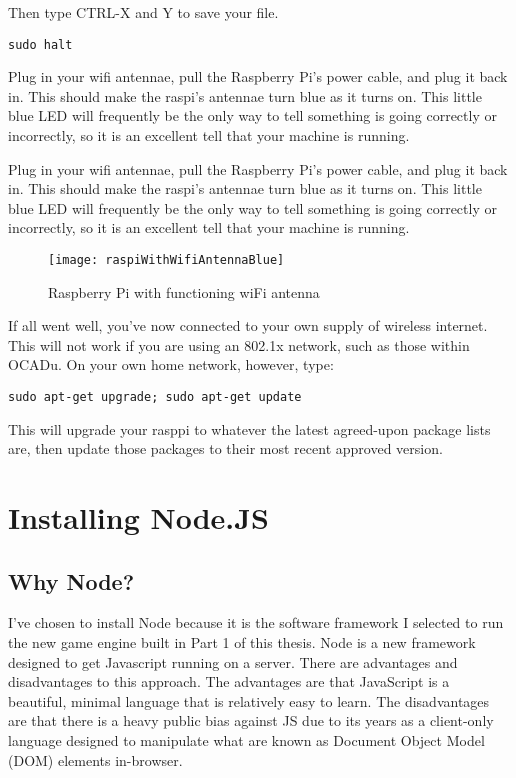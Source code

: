 Then type CTRL-X and Y to save your file.

\begin{lstlisting}
sudo halt
\end{lstlisting}

Plug in your wifi antennae, pull the Raspberry Pi's power cable, and plug it back in. This should make the raspi's antennae turn blue as it turns on. This little blue LED will frequently be the only way to tell something is going correctly or incorrectly, so it is an excellent tell that your machine is running.

Plug in your wifi antennae, pull the Raspberry Pi's power cable, and plug it back in. This should make the raspi's antennae turn blue as it turns on. This little blue LED will frequently be the only way to tell something is going correctly or incorrectly, so it is an excellent tell that your machine is running. 

\begin{figure}[left][h!][center]
\centering
\texttt{[image: raspiWithWifiAntennaBlue]}
\caption{Raspberry Pi with functioning wiFi antenna}
\end{figure}

If all went well, you've now connected to your own supply of wireless internet. This will not work if you are using an 802.1x network, such as those within OCADu. On your own home network, however, type:

\begin{lstlisting}
sudo apt-get upgrade; sudo apt-get update
\end{lstlisting}

This will upgrade your rasppi to whatever the latest agreed-upon package lists are, then update those packages to their most recent approved version.

\section{Installing Node.JS}
\subsection{Why Node?}
I've chosen to install Node because it is the software framework I selected to run the new game engine built in Part 1 of this thesis. Node is a new framework designed to get Javascript running on a server. There are advantages and disadvantages to this approach. The advantages are that JavaScript is a beautiful, minimal language that is relatively easy to learn. The disadvantages are that there is a heavy public bias against JS due to its years as a client-only language designed to manipulate what are known as Document Object Model (DOM) elements in-browser.

